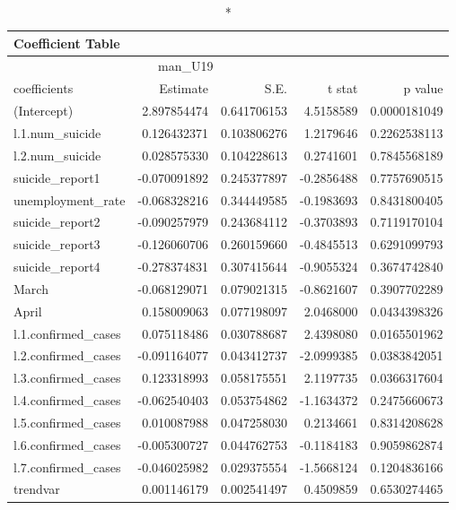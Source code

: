 \begin{longtable}{lrrrr}
\caption*{
{\large Coefficient Table}
} \\ 
\toprule
\multicolumn{4}{c}{man\_U19} &  \\ 
\cmidrule(lr){1-4}
coefficients & Estimate & S.E. & t stat & p value \\ 
\midrule\addlinespace[2.5pt]
(Intercept) & 2.897854474 & 0.641706153 & 4.5158589 & 0.0000181049 \\ 
l.1.num\_suicide & 0.126432371 & 0.103806276 & 1.2179646 & 0.2262538113 \\ 
l.2.num\_suicide & 0.028575330 & 0.104228613 & 0.2741601 & 0.7845568189 \\ 
suicide\_report1 & -0.070091892 & 0.245377897 & -0.2856488 & 0.7757690515 \\ 
unemployment\_rate & -0.068328216 & 0.344449585 & -0.1983693 & 0.8431800405 \\ 
suicide\_report2 & -0.090257979 & 0.243684112 & -0.3703893 & 0.7119170104 \\ 
suicide\_report3 & -0.126060706 & 0.260159660 & -0.4845513 & 0.6291099793 \\ 
suicide\_report4 & -0.278374831 & 0.307415644 & -0.9055324 & 0.3674742840 \\ 
March & -0.068129071 & 0.079021315 & -0.8621607 & 0.3907702289 \\ 
April & 0.158009063 & 0.077198097 & 2.0468000 & 0.0434398326 \\ 
l.1.confirmed\_cases & 0.075118486 & 0.030788687 & 2.4398080 & 0.0165501962 \\ 
l.2.confirmed\_cases & -0.091164077 & 0.043412737 & -2.0999385 & 0.0383842051 \\ 
l.3.confirmed\_cases & 0.123318993 & 0.058175551 & 2.1197735 & 0.0366317604 \\ 
l.4.confirmed\_cases & -0.062540403 & 0.053754862 & -1.1634372 & 0.2475660673 \\ 
l.5.confirmed\_cases & 0.010087988 & 0.047258030 & 0.2134661 & 0.8314208628 \\ 
l.6.confirmed\_cases & -0.005300727 & 0.044762753 & -0.1184183 & 0.9059862874 \\ 
l.7.confirmed\_cases & -0.046025982 & 0.029375554 & -1.5668124 & 0.1204836166 \\ 
trendvar & 0.001146179 & 0.002541497 & 0.4509859 & 0.6530274465 \\ 
\bottomrule
\end{longtable}

